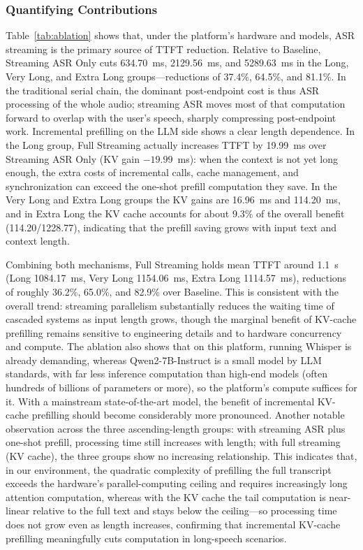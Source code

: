 \documentclass[a4paper,11pt]{article}
\begin{document}
\subsubsection{Quantifying Contributions}

Table~\ref{tab:ablation} shows that, under the platform's hardware and models, ASR streaming is the primary source of TTFT reduction. Relative to Baseline, Streaming ASR Only cuts 634.70~ms, 2129.56~ms, and 5289.63~ms in the Long, Very Long, and Extra Long groups---reductions of 37.4\%, 64.5\%, and 81.1\%. In the traditional serial chain, the dominant post-endpoint cost is thus ASR processing of the whole audio; streaming ASR moves most of that computation forward to overlap with the user's speech, sharply compressing post-endpoint work. Incremental prefilling on the LLM side shows a clear length dependence. In the Long group, Full Streaming actually increases TTFT by 19.99~ms over Streaming ASR Only (KV gain $-19.99$~ms): when the context is not yet long enough, the extra costs of incremental calls, cache management, and synchronization can exceed the one-shot prefill computation they save. In the Very Long and Extra Long groups the KV gains are 16.96~ms and 114.20~ms, and in Extra Long the KV cache accounts for about 9.3\% of the overall benefit (114.20/1228.77), indicating that the prefill saving grows with input text and context length.

Combining both mechanisms, Full Streaming holds mean TTFT around 1.1~s (Long 1084.17~ms, Very Long 1154.06~ms, Extra Long 1114.57~ms), reductions of roughly 36.2\%, 65.0\%, and 82.9\% over Baseline. This is consistent with the overall trend: streaming parallelism substantially reduces the waiting time of cascaded systems as input length grows, though the marginal benefit of KV-cache prefilling remains sensitive to engineering details and to hardware concurrency and compute. The ablation also shows that on this platform, running Whisper is already demanding, whereas Qwen2-7B-Instruct is a small model by LLM standards, with far less inference computation than high-end models (often hundreds of billions of parameters or more), so the platform's compute suffices for it. With a mainstream state-of-the-art model, the benefit of incremental KV-cache prefilling should become considerably more pronounced. Another notable observation across the three ascending-length groups: with streaming ASR plus one-shot prefill, processing time still increases with length; with full streaming (KV cache), the three groups show no increasing relationship. This indicates that, in our environment, the quadratic complexity of prefilling the full transcript exceeds the hardware's parallel-computing ceiling and requires increasingly long attention computation, whereas with the KV cache the tail computation is near-linear relative to the full text and stays below the ceiling---so processing time does not grow even as length increases, confirming that incremental KV-cache prefilling meaningfully cuts computation in long-speech scenarios.
\end{document}
